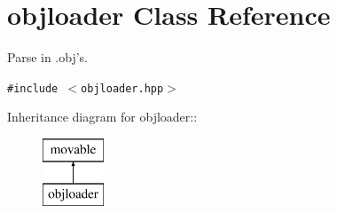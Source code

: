 \section{objloader  Class Reference}
\label{classobjloader}
Parse in .obj's. 


{\tt \#include $<$objloader.hpp$>$}

Inheritance diagram for objloader::\begin{figure}[H]
\begin{center}
\leavevmode
\includegraphics[height=2cm]{classobjloader}
\end{center}
\end{figure}
